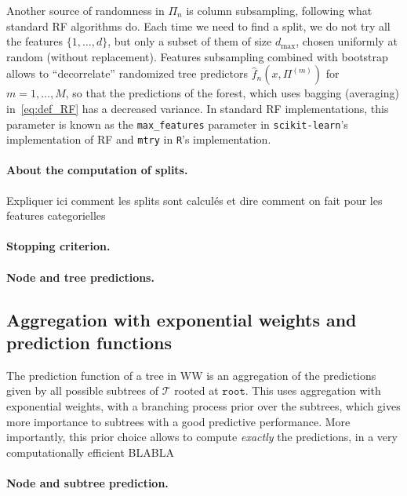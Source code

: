 \documentclass{article}
\renewcommand{\root}{\mathtt{root}} %
\newcommand{\tree}{\mathcal{T}} %
\begin{document}
Another source of randomness in $\Pi_n$ is column subsampling, following what standard RF algorithms do.
Each time we need to find a split, we do not try all the features $\{1, \ldots, d\}$, but only a subset of them of size $d_{\max}$, chosen uniformly at random (without replacement).
Features subsampling combined with bootstrap allows to ``decorrelate'' randomized tree predictors $\widehat f_n(x, \Pi^{(m)})$ for $m=1, \ldots, M$, so that the predictions of the forest, which uses bagging (averaging) in~\eqref{eq:def_RF} has a decreased variance.
In standard RF implementations, this parameter is known as the \verb+max_features+ parameter in \texttt{scikit-learn}'s implementation of RF and \texttt{mtry} in \texttt{R}'s implementation.


\paragraph{About the computation of splits.}

Expliquer ici comment les splits sont calculés et dire comment on fait pour les features categorielles


\paragraph{Stopping criterion.}



\paragraph{Node and tree predictions.}



\subsection{Aggregation with exponential weights and prediction functions}
\label{sub:agg-ctw}

The prediction function of a tree in WW is an aggregation of the predictions given by all possible subtrees of $\tree$ rooted at $\root$.
This uses aggregation with exponential weights, with a branching process prior over the subtrees, which gives more importance to subtrees with a good predictive performance.
More importantly, this prior choice allows to compute \emph{exactly} the predictions, in a very computationally efficient BLABLA

\paragraph{Node and subtree prediction.}
\end{document}
